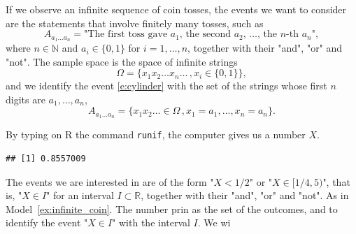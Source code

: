 \begin{model}
	\label{ex:infinite_coin}
	If we observe an infinite sequence of coin tosses, the events we want to consider are the statements that involve finitely many tosses, such as 
	\begin{equation}
		\label{e:cylinder}
		A_{a_1 \ldots a_n} = \text{"The first toss gave $a_1$, the second $a_2$, \ldots, the $n$-th $a_n$"}, 
	\end{equation}
	where $n \in \mathbb N$ and $a_i \in \{0,1\}$ for $i = 1, \ldots, n$, together with their "and", "or" and "not". The sample space is the space of infinite strings 
	\begin{equation}
		\label{e:infinite_coin}
		\Omega = \{x_1 x_2 \ldots x_n \ldots \,, x_i \in \{0,1\}\}, 
	\end{equation}
	and we identify the event \eqref{e:cylinder} with the set of the strings whose first $n$ digits are $a_1, \ldots, a_n$, 
	\begin{equation}
		\label{e:infinite_coin_set}
		A_{a_1 \ldots a_n} = \{x_1 x_2 \ldots \in \Omega \,, x_1 = a_1, \ldots, x_n = a_n\}. 
	\end{equation}
\end{model}

\begin{model}
	\label{ex:unif}
	By typing on R the command \texttt{runif}, the computer gives us a number $X$.  
\begin{knitrout}
\color{fgcolor}\begin{kframe}
\begin{alltt}
\hldef{(}\hldef{)}
\end{alltt}
\begin{verbatim}
## [1] 0.8557009
\end{verbatim}
\end{kframe}
\end{knitrout}
	The events we are interested in are of the form "$X < 1/2$" or "$X \in [1/4, 5)$", that is, "$X \in I$" for an interval $I\subset \mathbb R$, together with their "and", "or" and "not". As in Model~\ref{ex:infinite_coin}. The number prin 
	as the set of the outcomes, and to identify the event "$X \in I$" with the interval $I$. We wi
\end{model}




